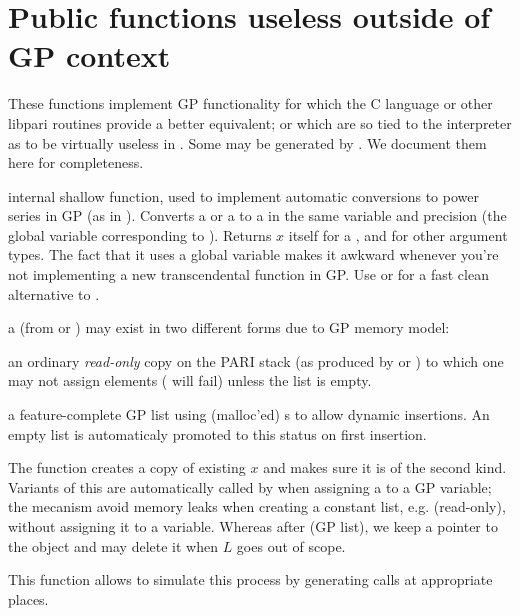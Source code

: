 \section{Public functions useless outside of GP context}

These functions implement GP functionality for which the C language or
other libpari routines provide a better equivalent; or which are so tied
to the  interpreter as to be virtually useless in . Some
may be generated by . We document them here for completeness.


 internal shallow function, used to implement
automatic conversions to power series in GP (as in ).
Converts a  or a  to a  in the same variable and
precision  (the global variable corresponding to
). Returns $x$ itself for a , and 
for other argument types. The fact that it uses a global variable makes it
awkward whenever you're not implementing a new transcendental function in GP.
Use  or  for a fast clean alternative to
.

 a  (from  or ) may
exist in two different forms due to GP memory model:

\item an ordinary \emph{read-only} copy on the PARI stack (as produced by
 or ) to which one may not assign elements
( will fail) unless the list is empty.

\item a feature-complete GP list using (malloc'ed) s to
allow dynamic insertions. An empty list is automaticaly promoted to this
status on first insertion.

The  function creates a copy of existing  $x$ and
makes sure it is of the second kind. Variants of this are automatically
called by  when assigning a  to a GP variable; the
mecanism avoid memory leaks when creating a constant list, e.g.
 (read-only), without assigning it to a variable. Whereas
after  (GP list), we keep a pointer to the object and
may delete it when $L$ goes out of scope.

This  function allows  to simulate this process by
generating  calls at appropriate places.

